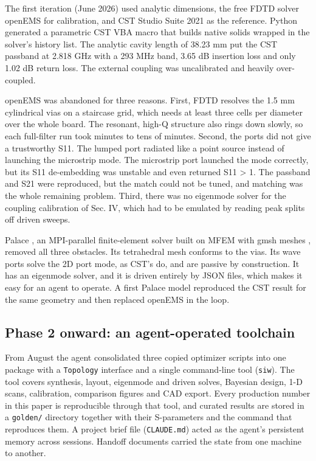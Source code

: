 \documentclass{ieeeaccess}
\begin{document}
The first iteration (June 2026) used analytic dimensions, the free FDTD solver
openEMS \cite{liebig2013openems} for calibration, and CST Studio Suite 2021
\cite{cst2021} as the reference. Python generated a parametric CST VBA macro that
builds native solids wrapped in the solver's history list. The analytic cavity
length of 38.23 mm put the CST passband at 2.818 GHz with a 293 MHz band,
3.65 dB insertion loss and only 1.02 dB return loss. The external coupling was
uncalibrated and heavily over-coupled.

openEMS was abandoned for three reasons. First, FDTD resolves the 1.5 mm
cylindrical vias on a staircase grid, which needs at least three cells per
diameter over the whole board. The resonant, high-Q structure also rings down
slowly, so each full-filter run took minutes to tens of minutes. Second, the
ports did not give a trustworthy S11. The lumped port radiated like a point
source instead of launching the microstrip mode. The microstrip port launched
the mode correctly, but its S11 de-embedding was unstable and even returned
\textbar S11\textbar{} \textgreater{} 1. The passband and S21 were reproduced, but the match could not be
tuned, and matching was the whole remaining problem. Third, there was no eigenmode solver for the
coupling calibration of Sec. IV, which had to be emulated by reading peak
splits off driven sweeps.

Palace \cite{palace2023}, an MPI-parallel finite-element solver built on MFEM
\cite{anderson2021mfem} with gmsh meshes \cite{geuzaine2009gmsh}, removed all three
obstacles. Its tetrahedral mesh conforms to the vias. Its wave ports solve the
2D port mode, as CST's do, and are passive by construction. It has an
eigenmode solver, and it is driven entirely by JSON files, which makes it easy
for an agent to operate. A first Palace model reproduced the CST result for
the same geometry and then replaced openEMS in the loop.

\hypertarget{phase-2-onward-an-agent-operated-toolchain}{%
\subsection{Phase 2 onward: an agent-operated toolchain}\label{phase-2-onward-an-agent-operated-toolchain}}

From August the agent consolidated three copied optimizer scripts into one
package with a \texttt{Topology} interface and a single command-line tool (\texttt{siw}).
The tool covers synthesis, layout, eigenmode and driven solves, Bayesian
design, 1-D scans, calibration, comparison figures and CAD export. Every
production number in this paper is reproducible through that tool, and curated
results are stored in a \texttt{golden/} directory together with their S-parameters
and the command that reproduces them. A project brief file (\texttt{CLAUDE.md}) acted
as the agent's persistent memory across sessions. Handoff documents carried
the state from one machine to another.
\end{document}
